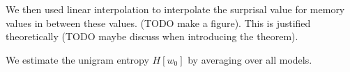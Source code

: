 \documentclass[11pt,letterpaper]{article}
\newcounter{theorem}
\begin{document}
We then used linear interpolation to interpolate the surprisal value for memory values in between these values. (TODO make a figure).
This is justified theoretically (TODO maybe discuss when introducing the theorem).

We estimate the unigram entropy $H[w_0]$ by averaging over all models.

%
%
%
%



\end{document}

